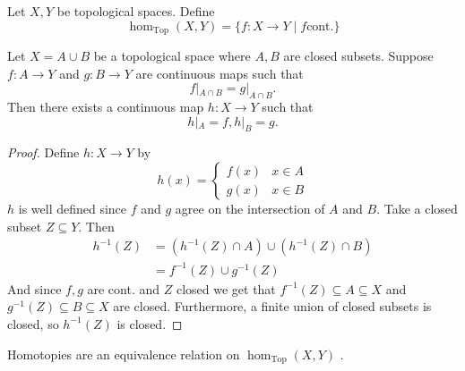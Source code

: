 \begin{definition}
    Let \( X, Y \) be topological spaces.
    Define
    \begin{equation}
      \hom_{\text{Top}}(X, Y) = \{ f:X \to Y \mid f \text{cont.} \} 
    \end{equation}
\end{definition}

\begin{lemma}
   Let \( X = A \cup B \) be a topological space
   where \( A, B \) are closed subsets.
   Suppose  \( f: A \to Y \) and \( g: B \to Y \) are
   continuous maps such that
  \[
    f|_{A\cap B} = g|_{A\cap B}.
  \] 
  Then there exists a continuous map \( h:X \to Y \)
  such that
  \[
    h|_A = f, h|_B = g.
  \]
\end{lemma}

\begin{proof}
    Define \( h:X \to Y \) by
    \[
      h(x) = \begin{cases}
        f(x) & x \in A \\
        g(x) & x \in B
      \end{cases}
    \]
    \( h \) is well defined since \( f \) and \( g \) agree
    on the intersection of \( A \) and \( B \).
    Take a closed subset \( Z \subseteq Y \).
    Then
    \begin{align*}
      {h}^{-1} (Z) &=( {h}^{-1} (Z) \cap A ) \cup ( {h}^{-1} (Z) \cap B ) \\
                   &= {f}^{-1} (Z) \cup {g}^{-1} (Z)
    \end{align*}
    And since \( f, g \) are cont. and \( Z \) closed
    we get that \( {f}^{-1} (Z) \subseteq A \subseteq X \)
    and \( {g}^{-1} (Z) \subseteq B \subseteq X \) are closed.
    Furthermore, a finite union of closed subsets is closed,
    so \( {h}^{-1} (Z) \) is closed.
\end{proof}

\begin{theorem}
   Homotopies are an equivalence relation on  \( \hom_{\text{Top}}(X, Y) \) .
\end{theorem}

